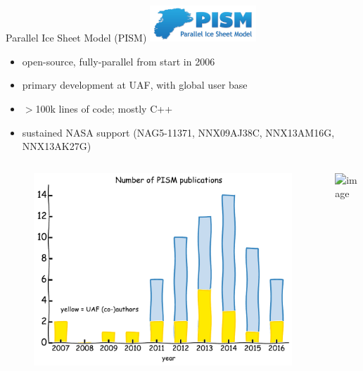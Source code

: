 \documentclass[hide notes,intlimits]{beamer}
\begin{document}
\begin{frame}{Parallel Ice Sheet Model (PISM)}
  \includegraphics[width=4cm]{pism-logo}
  \begin{itemize}
  \item open-source, fully-parallel from start in 2006
  \item primary development at UAF, with global user base
  \item $>$100k lines of code; mostly C++
  \item sustained NASA support \tiny (NAG5-11371, NNX09AJ38C, NNX13AM16G, NNX13AK27G)
  \end{itemize}
  \begin{columns}
    \column[c]{4.75cm}
    \begin{figure}
      \includegraphics[width=\textwidth]{pism-uaf-publications}
    \end{figure}
    \column[c]{6.25cm}
    \includegraphics<1>[width=\textwidth]{pism-users}
  \end{columns}
\end{frame}


\end{document}
